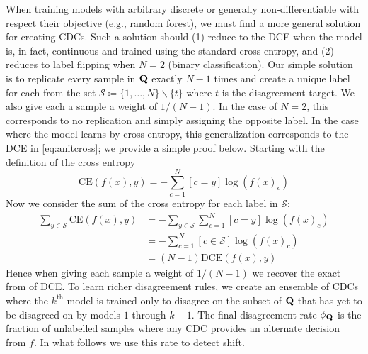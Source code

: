      When training models with arbitrary discrete or generally non-differentiable with respect their objective (e.g., random forest), we must find a more general solution for creating CDCs.
Such a solution should (1) reduce to the DCE when the model is, in fact, continuous and trained using the standard cross-entropy, and (2) reduces to label flipping when $N=2$ (binary classification).
Our simple solution is to replicate every sample in $\mathbf{Q}$ exactly $N-1$ times and create a unique label for each
from the set $\mathcal{S}\coloneqq \{1,\dots,N\}\backslash \{t\}$ where $t$ is the disagreement target.
We also give each a sample a weight of $1/(N-1)$.
In the case of $N=2$, this corresponds to no replication and simply assigning the opposite label.
In the case where the model learns by cross-entropy, this generalization corresponds to the DCE in \autoref{eq:anitcross}; we provide a simple proof below.
\smallbreak\noindent
Starting with the definition of the cross entropy
\begin{equation}
    \text{CE}(f(x), y) = -\sum_{c=1}^N [{c=y}] \log(f(x)_c)
\end{equation}
Now we consider the sum of the cross entropy for each label in $\mathcal{S}$:
\begin{align}
    \sum_{y\in \mathcal{S}} \text{CE}(f(x), y) &= -\sum_{y\in \mathcal{S}} \sum_{c=1}^{N}[{c=y}]\log(f(x)_c) \\
    &=-\sum_{c=1}^{N}[{c\in \mathcal{S}}]\log(f(x)_c)\\
    &= (N-1) \text{DCE}(f(x), y)
\end{align}
Hence when giving each sample a weight of $1/(N-1)$ we recover the exact from of DCE.
\smallbreak
{} To learn richer disagreement rules, we create an
ensemble of CDCs where the $k^{\text{th}}$ model is trained only to disagree on the subset of
$\mathbf{Q}$ that has yet to be disagreed on by models $1$ through $k-1$.
The final disagreement rate $\phi_{\mathbf{Q}}$ is the fraction of unlabelled samples where any CDC provides an alternate decision from $f$.
In what follows we use this rate to detect shift.


